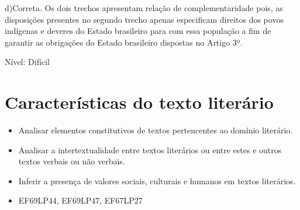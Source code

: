 d)Correta. Os dois trechos apresentam relação de complementaridade pois,
as disposições presentes no segundo trecho apenas especificam direitos
dos povos indígenas e deveres do Estado brasileiro para com essa
população a fim de garantir as obrigações do Estado brasileiro dispostas
no Artigo 3º.

Nível: Difícil


\chapter{Características do texto literário}


\begin{itemize}
  
\item Analisar elementos constitutivos de textos pertencentes ao domínio literário.
  
  \item Analisar a intertextualidade entre textos literários ou entre estes e outros textos 
verbais ou não verbais.
  
  \item Inferir a presença de valores sociais, culturais e humanos em textos literários.

\end{itemize}


\begin{itemize}

  \item EF69LP44, EF69LP47, EF67LP27

\end{itemize}

